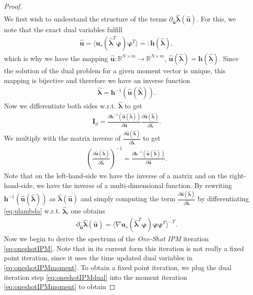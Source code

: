 \begin{proof}
\begin{align}
\end{align}
We first wish to understand the structure of the terms $\partial_{\bm{\hat u}} \bm{\hat \lambda}(\bm{\hat u})$. For this, we note that the exact dual variables fulfill
\begin{align}\label{eq:ulambda}
\bm{\hat u} = \langle \bm{u}_s(\bm{\hat \lambda}^T\bm{\varphi})\bm{\varphi}^T\rangle =: \bm{h}(\bm{\hat \lambda}),
\end{align}
which is why we have the mapping $\bm{\hat u}:\mathbb{R}^{N\times m}\to\mathbb{R}^{N\times m}$, $\bm{\hat u}(\bm{\hat \lambda}) = \bm{h}(\bm{\hat \lambda})$. Since the solution of the dual problem for a given moment vector is unique, this mapping is bijective and therefore we have an inverse function
\begin{align}\label{eq:lambdau}
\bm{\hat \lambda} = \bm{h}^{-1}(\bm{\hat u}(\bm{\hat \lambda})).
\end{align}
Now we differentiate both sides w.r.t. $\bm{\hat \lambda}$ to get
\begin{align*}
\bm{I}_{d} = \frac{\partial \bm{h}^{-1}(\bm{\hat u}(\bm{\hat \lambda}))}{\partial \bm{\hat u}}\frac{\partial \bm{\hat u}(\bm{\hat \lambda})}{\partial \bm{\hat \lambda}}.
\end{align*}
We multiply with the matrix inverse of $\frac{\partial \bm{\hat u}(\bm{\hat \lambda})}{\partial \bm{\hat \lambda}}$ to get
\begin{align*}
\left(\frac{\partial \bm{\hat u}(\bm{\hat \lambda})}{\partial \bm{\hat \lambda}}\right)^{-1} = \frac{\partial \bm{h}^{-1}(\bm{\hat u}(\bm{\hat \lambda}))}{\partial \bm{\hat u}}.
\end{align*}
Note that on the left-hand-side we have the inverse of a matrix and on the right-hand-side, we have the inverse of a multi-dimensional function. By rewriting $\bm{h}^{-1}(\bm{\hat u}(\bm{\hat \lambda}))$ as $\bm{\hat \lambda}(\bm{\hat u})$ and simply computing the term $\frac{\partial \bm{\hat u}(\bm{\hat \lambda})}{\partial \bm{\hat \lambda}}$ by differentiating \eqref{eq:ulambda} w.r.t. $\bm{\hat \lambda}$, one obtains
\begin{align}\label{eq:dudlambdaex}
\partial_{\bm{\hat u}} \bm{\hat \lambda}(\bm{\hat u}) = \langle \nabla\bm{u}_s(\bm{\hat \lambda}^T\bm{\varphi})\bm{\varphi}\bm{\varphi}^T\rangle^{-T}.
\end{align}
Now we begin to derive the spectrum of the \textit{One-Shot IPM} iteration \eqref{eq:oneshotIPM}. Note that in its current form this iteration is not really a fixed point iteration, since it uses the time updated dual variables in \eqref{eq:oneshotIPMmoment}. To obtain a fixed point iteration, we plug the dual iteration step \eqref{eq:oneshotIPMdual} into the moment iteration \eqref{eq:oneshotIPMmoment} to obtain

\end{proof}
